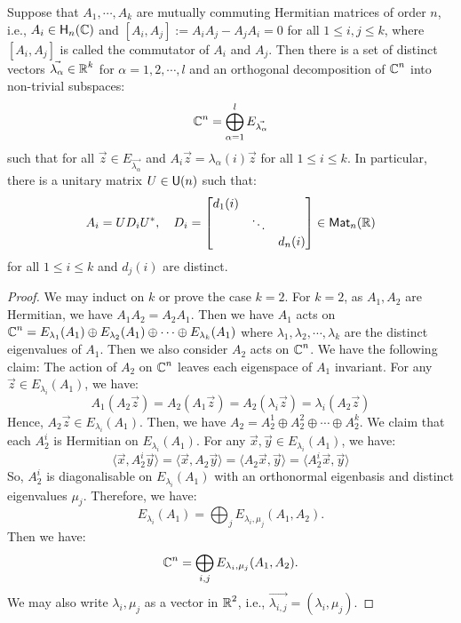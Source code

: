 \begin{theorem}
	Suppose that $A_1, \cdots, A_k$ are mutually commuting Hermitian matrices of order $n$, i.e., $A_i \in \text{\normalfont\sffamily H}_n(\operatorname{\mathbb{C}})$ and $[A_i, A_j] := A_i A_j - A_j A_i = 0$ for all $1 \leq i, j \leq k$, where $[A_i, A_j]$ is called the commutator of $A_i$ and $A_j$. Then there is a set of distinct vectors $\vec{\lambda_\alpha} \in \operatorname{\mathbb{R}}^k$ for $\alpha = 1, 2, \cdots, l$ and an orthogonal decomposition of $\operatorname{\mathbb{C}}^n$ into non-trivial subspaces:
	\[
		\operatorname{\mathbb{C}}^n = \bigoplus_{\alpha=1}^l E_{\vec{\lambda_\alpha}}
	\]
	such that for all $\vec{z} \in E_{\vec{\lambda_\alpha}}$ and $A_i \vec{z} = \lambda_\alpha(i) \vec{z}$ for all $1 \leq i \leq k$. In particular, there is a unitary matrix $U \in \operatorname{\text{\normalfont\sffamily U}}(n)$ such that:
	\[
		A_i = U D_i U^*, \quad D_i = \begin{bmatrix}
			d_1 (i)             \\
			 & \ddots           \\
			 &        & d_n (i)
		\end{bmatrix} \in \operatorname{\text{\normalfont\sffamily Mat}}_n(\operatorname{\mathbb{R}})
	\]
	for all $1 \leq i \leq k$ and $d_j(i)$ are distinct.
\end{theorem}
\begin{proof}
	We may induct on $k$ or prove the case $k = 2$. For $k = 2$, as $A_1, A_2$ are Hermitian, we have $A_1 A_2 = A_2 A_1$. Then we have $A_1$ acts on $\operatorname{\mathbb{C}}^n = E_{\lambda_1} (A_1) \oplus E_{\lambda_2} (A_1) \oplus \cdots \oplus E_{\lambda_k} (A_1)$ where $\lambda_1, \lambda_2, \cdots, \lambda_k$ are the distinct eigenvalues of $A_1$. Then we also consider $A_2$ acts on $\operatorname{\mathbb{C}}^n$. We have the following claim: The action of $A_2$ on $\operatorname{\mathbb{C}}^n$ leaves each eigenspace of $A_1$ invariant. For any $\vec{z} \in E_{\lambda_i} (A_1)$, we have:
	\[
		A_1 (A_2 \vec{z}) = A_2 (A_1 \vec{z}) = A_2 (\lambda_i \vec{z}) = \lambda_i (A_2 \vec{z})
	\]
	Hence, $A_2 \vec{z} \in E_{\lambda_i} (A_1)$. Then, we have $A_2 = A_2^1 \oplus A_2^2 \oplus \cdots \oplus A_2^k$. We claim that each $A_2^i$ is Hermitian on $E_{\lambda_i} (A_1)$. For any $\vec{x}, \vec{y} \in E_{\lambda_i} (A_1)$, we have:
	\[
		\langle \vec{x}, A_2^i \vec{y} \rangle = \langle \vec{x}, A_2 \vec{y} \rangle = \langle A_2 \vec{x}, \vec{y} \rangle = \langle A_2^i \vec{x}, \vec{y} \rangle
	\]
	So, $A_2^i$ is diagonalisable on $E_{\lambda_i} (A_1)$ with an orthonormal eigenbasis and distinct eigenvalues $\mu_j$. Therefore, we have:
	\[
		E_{\lambda_i} (A_1) = \bigoplus_j E_{\lambda_i, \mu_j} (A_1, A_2).
	\]
	Then we have:
	\[
		\operatorname{\mathbb{C}}^n = \bigoplus_{i, j} E_{\lambda_i, \mu_j} (A_1, A_2).
	\]
	We may also write $\lambda_i, \mu_j$ as a vector in $\operatorname{\mathbb{R}}^2$, i.e., $\vec{\lambda_{i, j}} = (\lambda_i, \mu_j)$.
\end{proof}

